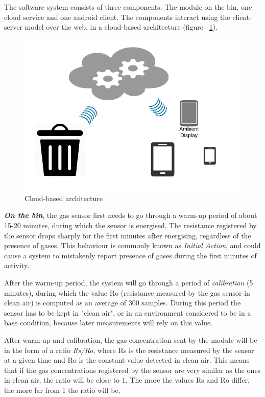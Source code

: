The software system consists of three components. The module on the bin, one cloud service and one android client.
The components interact using the client-server model over the web, in a cloud-based architecture (figure ~\ref{fig:architecture}).

\begin{figure}
\centering
\includegraphics[scale=.6]{img/architecture}
\caption{Cloud-based architecture}
\label{fig:architecture}
\end{figure}

\textit{ \textbf{On the bin}}, the gas sensor first needs to go through a warm-up period of about 15-20 minutes, during which the sensor is energised. The resistance registered by the sensor drops sharply for the first minutes after energising, regardless of the presence of gases. This behaviour is commonly known as \textit{Initial Action}, and could cause a system to mistakenly report presence of gases during the first minutes of activity\cite{tgs2602}.

After the warm-up period, the system will go through a period of \textit{calibration} (5 minutes), during which the value Ro (resistance measured by the gas sensor in clean air) is computed as an average of 300 samples.
During this period the sensor has to be kept in "clean air", or  in an environment considered to be in a base condition, because later measurements will rely on this value.

After warm up and calibration, the gas concentration sent by the module will be in the form of a ratio \textit{Rs/Ro}, where Rs is the resistance measured by the sensor at a given time and Ro is the constant value detected in clean air.
This means that if the gas concentrations registered by the sensor are very similar as the ones in clean air, the ratio will be close to 1.
The more the values Rs and Ro differ, the more far from 1 the ratio will be.


